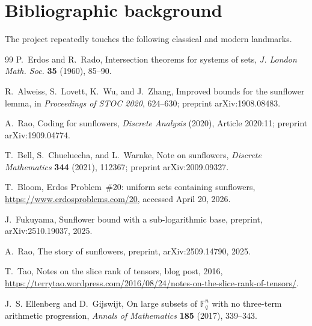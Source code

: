 \documentclass[11pt]{article}
\theoremstyle{definition}
\newcommand{\1}{\mathbf{1}}
\begin{document}
\section{Bibliographic background}\label{app:biblio}
The project repeatedly touches the following classical and modern landmarks.
\begin{thebibliography}{99}
P.~Erdos and R.~Rado,
\newblock Intersection theorems for systems of sets,
\newblock \emph{J. London Math. Soc.} \textbf{35} (1960), 85--90.

R.~Alweiss, S.~Lovett, K.~Wu, and J.~Zhang,
\newblock Improved bounds for the sunflower lemma,
\newblock in \emph{Proceedings of STOC 2020}, 624--630; preprint arXiv:1908.08483.

A.~Rao,
\newblock Coding for sunflowers,
\newblock \emph{Discrete Analysis} (2020), Article 2020:11; preprint arXiv:1909.04774.

T.~Bell, S.~Chueluecha, and L.~Warnke,
\newblock Note on sunflowers,
\newblock \emph{Discrete Mathematics} \textbf{344} (2021), 112367; preprint arXiv:2009.09327.

T.~Bloom,
\newblock Erdos Problem \,\#20: uniform sets containing sunflowers,
\newblock \url{https://www.erdosproblems.com/20}, accessed April 20, 2026.

J.~Fukuyama,
\newblock Sunflower bound with a sub-logarithmic base,
\newblock preprint, arXiv:2510.19037, 2025.

A.~Rao,
\newblock The story of sunflowers,
\newblock preprint, arXiv:2509.14790, 2025.

T.~Tao,
\newblock Notes on the slice rank of tensors,
\newblock blog post, 2016, \url{https://terrytao.wordpress.com/2016/08/24/notes-on-the-slice-rank-of-tensors/}.

J.~S. Ellenberg and D.~Gijswijt,
\newblock On large subsets of $\mathbb F_q^n$ with no three-term arithmetic progression,
\newblock \emph{Annals of Mathematics} \textbf{185} (2017), 339--343.
\end{thebibliography}
\end{document}
